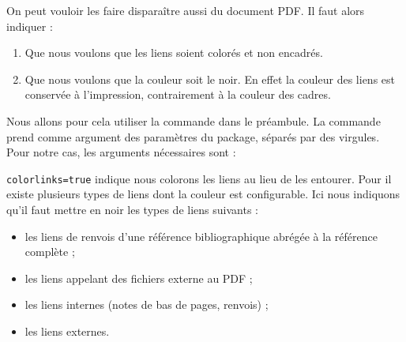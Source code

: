 On peut vouloir les faire disparaître aussi du document PDF. Il faut alors indiquer :
\begin{enumerate}
\item Que nous voulons que les liens soient colorés et non encadrés.
\item Que nous voulons que la couleur soit le noir. En effet la couleur des liens est conservée à l'impression, contrairement à la couleur des cadres.
\end{enumerate}

Nous allons pour cela utiliser la commande  dans le préambule. La commande prend comme argument des paramètres du package, séparés par des virgules.
Pour notre cas, les arguments nécessaires sont :

\begin{latexcode}
\hypersetup{colorlinks=true,
citecolor=black,
filecolor=black,
linkcolor=black,
urlcolor=black}
\end{latexcode}

\verb|colorlinks=true| indique nous colorons les liens au lieu de les entourer. Pour  il existe plusieurs types de liens dont la couleur est configurable. Ici nous indiquons qu'il faut mettre en noir les types de liens suivants  :\begin{itemize}
\item les liens de renvois d'une référence bibliographique abrégée à la référence complète ;
\item les liens appelant des fichiers externe au PDF ;
\item les liens internes (notes de bas de pages, renvois) ;
\item les liens externes.
\end{itemize}
